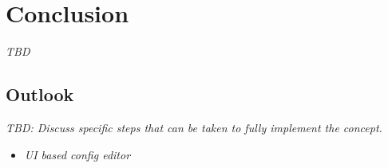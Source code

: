 \chapter{Conclusion}
\label{chap:conclusion}

\emph{TBD}

\section{Outlook}
\label{sec:outlook}
\emph{TBD: Discuss specific steps that can be taken to fully implement the concept.}
\begin{itemize}
    \item \emph{UI based config editor}
\end{itemize}